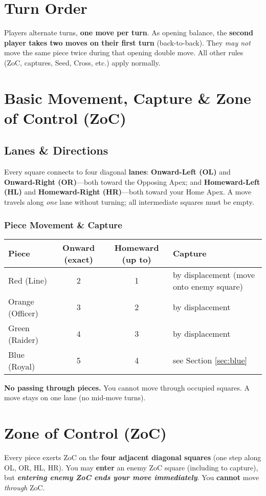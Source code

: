 \documentclass[11pt]{article}
\begin{document}
\section{Turn Order}
\label{sec:turnorder}

Players alternate turns, \textbf{one move per turn}. As opening balance, the \textbf{second player takes two moves on their first turn} (back-to-back). They \emph{may not} move the same piece twice during that opening double move. All other rules (ZoC, captures, Seed, Cross, etc.) apply normally.

\section{Basic Movement, Capture \& Zone of Control (ZoC)}
\label{sec:movement}

\subsection*{Lanes \& Directions}
Every square connects to four diagonal \textbf{lanes}: \textbf{Onward-Left (OL)} and \textbf{Onward-Right (OR)}—both toward the Opposing Apex; and \textbf{Homeward-Left (HL)} and \textbf{Homeward-Right (HR)}—both toward your Home Apex. A move travels along \emph{one} lane without turning; all intermediate squares must be empty.

\subsubsection*{Piece Movement \& Capture}
\begin{tabularx}{\linewidth}{@{}l c c l@{}}
\toprule
\textbf{Piece} & \textbf{Onward (exact)} & \textbf{Homeward (up to)} & \textbf{Capture}\\
\midrule
Red (Line)      & 2 & 1 & by displacement (move onto enemy square)\\
Orange (Officer)& 3 & 2 & by displacement\\
Green (Raider)  & 4 & 3 & by displacement\\
Blue (Royal)    & 5 & 4 & see Section \ref{sec:blue}\\
\bottomrule
\end{tabularx}

\medskip
\noindent\textbf{No passing through pieces.} You cannot move through occupied squares. A move stays on one lane (no mid-move turns).

\section*{Zone of Control (ZoC)}
Every piece exerts ZoC on the \textbf{four adjacent diagonal squares} (one step along OL, OR, HL, HR). You may \textbf{enter} an enemy ZoC square (including to capture), but \textbf{\emph{entering enemy ZoC ends your move immediately}}. You \textbf{cannot} move \emph{through} ZoC.
\end{document}
